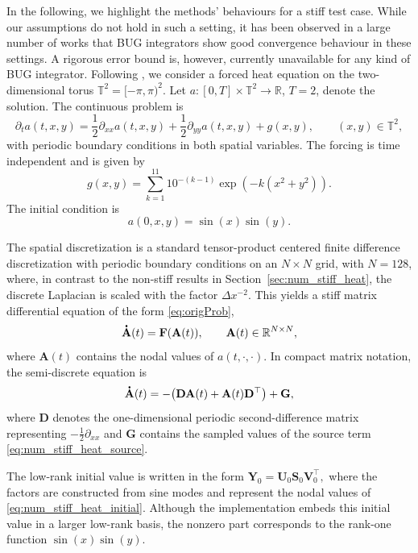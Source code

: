 \documentclass[preprint,runningheads]{svjour3}
\newcommand*{\dt}[1]{ \accentset{\mbox{\large\bfseries .}}{#1}}
\def\R{{\mathbb R}}
\def\torus{{\mathbb T}}
\newcommand\bfA{{\mathbf A}}
\newcommand\bfD{{\mathbf D}}
\newcommand\bfF{{\mathbf F}}
\newcommand\bfG{{\mathbf G}}
\newcommand\bfS{{\mathbf S}}
\newcommand\bfU{{\mathbf U}}
\newcommand\bfV{{\mathbf V}}
\newcommand\bfY{{\mathbf Y}}
\begin{document}
In the following, we highlight the methods' behaviours for a stiff test case. While our assumptions do not hold in such a setting, it has been observed in a large number of works that BUG integrators show good convergence behaviour in these settings. A rigorous error bound is, however, currently unavailable for any kind of BUG integrator. Following \cite{ceruti2024robust}, we consider a forced heat equation on the
two-dimensional torus $\torus^2=[-\pi,\pi)^2$. Let
$a:[0,T]\times\torus^2\to\R$, $T=2$, denote the solution. The continuous problem
is
\begin{equation}
\label{eq:num_stiff_heat_pde}
    \partial_t a(t,x,y)
    =
    \frac12\partial_{xx}a(t,x,y)
    +
    \frac12\partial_{yy}a(t,x,y)
    +
    g(x,y),
    \qquad (x,y)\in\torus^2,
\end{equation}
with periodic boundary conditions in both spatial variables. The forcing is
time independent and is given by
\begin{equation}
\label{eq:num_stiff_heat_source}
    g(x,y)
    =
    \sum_{k=1}^{11}
    10^{-(k-1)}
    \exp\!\left(-k(x^2+y^2)\right).
\end{equation}
The initial condition is
\begin{equation}
\label{eq:num_stiff_heat_initial}
    a(0,x,y)=\sin(x)\sin(y).
\end{equation}

The spatial discretization is a standard tensor-product centered finite
difference discretization with periodic boundary conditions on an $N\times N$ grid,
with $N=128$, where, in contrast to the non-stiff results in Section~\ref{sec:num_stiff_heat}, the discrete Laplacian is scaled with the factor
$\Delta x^{-2}$. This yields a stiff matrix differential equation of the form
\eqref{eq:origProb},
\[
    \dt{\bfA}(t)=\bfF(\bfA(t)),
    \qquad
    \bfA(t)\in\R^{N\times N},
\]
where $\bfA(t)$ contains the nodal values of $a(t,\cdot,\cdot)$. In compact
matrix notation, the semi-discrete equation is
\begin{equation}
\label{eq:num_stiff_heat_matrix_ode}
    \dt{\bfA}(t)
    =
    -\bigl(\bfD\bfA(t)+\bfA(t)\bfD^\top\bigr)
    +
    \bfG,
\end{equation}
where $\bfD$ denotes the one-dimensional periodic second-difference matrix
representing $-\frac12\partial_{xx}$ and $\bfG$ contains the sampled values of
the source term \eqref{eq:num_stiff_heat_source}.

The low-rank initial value is written in the form
$
    \bfY_0=\bfU_0\bfS_0\bfV_0^\top,
$
where the factors are constructed from sine modes and represent the nodal values
of \eqref{eq:num_stiff_heat_initial}. Although the implementation embeds this
initial value in a larger low-rank basis, the nonzero part corresponds to the
rank-one function $\sin(x)\sin(y)$.
\end{document}

